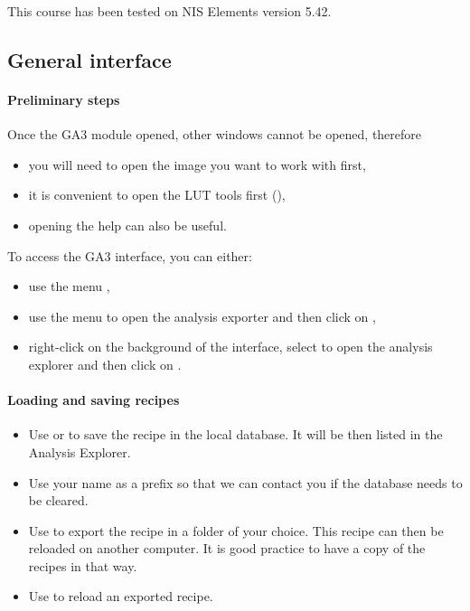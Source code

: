 
This course has been tested on NIS Elements version 5.42.

\subsection{General interface}


\paragraph{Preliminary steps}
Once the GA3 module opened, other windows cannot be opened, therefore
\begin{itemize}
    \item you will need to open the image you want to work with first,
    \item it is convenient to open the LUT tools first (),
    \item opening the help  can also be useful.
\end{itemize}
To access the GA3 interface, you can either:
\begin{itemize}
    \item use the menu ,
    \item use the menu  to open the analysis exporter and then click on ,
    \item right-click on the background of the interface, select  to open the analysis explorer and then click on .
\end{itemize}

\paragraph{Loading and saving recipes}

\begin{itemize}
    \item Use  or  to save the recipe in the local database. It will be then listed in the Analysis Explorer.
    \item Use your name as a prefix so that we can contact you if the database needs to be cleared.
    \item Use  to export the recipe in a folder of your choice. This recipe can then be reloaded on another computer. It is good practice to have a copy of the recipes in that way.
    \item Use  to reload an exported recipe. 
\end{itemize}

